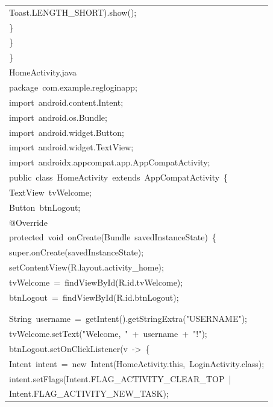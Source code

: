 \documentclass[a4paper,12pt]{article}
\begin{document}
\begin{longtable}{|p{}|}
{\ttfamily\small Toast.LENGTH\_SHORT).show();} \\
{\ttfamily\small \}} \\
{\ttfamily\small \}} \\
{\ttfamily\small \}} \\
{\ttfamily\small HomeActivity.java} \\
{\ttfamily\small package\ com.example.regloginapp;} \\
{\ttfamily\small import\ android.content.Intent;} \\
{\ttfamily\small import\ android.os.Bundle;} \\
{\ttfamily\small import\ android.widget.Button;} \\
{\ttfamily\small import\ android.widget.TextView;} \\
{\ttfamily\small import\ androidx.appcompat.app.AppCompatActivity;} \\
{\ttfamily\small public\ class\ HomeActivity\ extends\ AppCompatActivity\ \{} \\
{\ttfamily\small TextView\ tvWelcome;} \\
{\ttfamily\small Button\ btnLogout;} \\
{\ttfamily\small @Override} \\
{\ttfamily\small protected\ void\ onCreate(Bundle\ savedInstanceState)\ \{} \\
{\ttfamily\small super.onCreate(savedInstanceState);} \\
{\ttfamily\small setContentView(R.layout.activity\_home);} \\
{\ttfamily\small tvWelcome\ =\ findViewById(R.id.tvWelcome);} \\
{\ttfamily\small btnLogout\ =\ findViewById(R.id.btnLogout);} \\
\strut \\
\strut \\
{\ttfamily\small String\ username\ =\ getIntent().getStringExtra("USERNAME");} \\
{\ttfamily\small tvWelcome.setText("Welcome,\ "\ +\ username\ +\ "!");} \\
{\ttfamily\small btnLogout.setOnClickListener(v\ -\textgreater{}\ \{} \\
{\ttfamily\small Intent\ intent\ =\ new\ Intent(HomeActivity.this,\ LoginActivity.class);} \\
{\ttfamily\small intent.setFlags(Intent.FLAG\_ACTIVITY\_CLEAR\_TOP\ |} \\
{\ttfamily\small Intent.FLAG\_ACTIVITY\_NEW\_TASK);} \\

\end{longtable}
\end{document}
